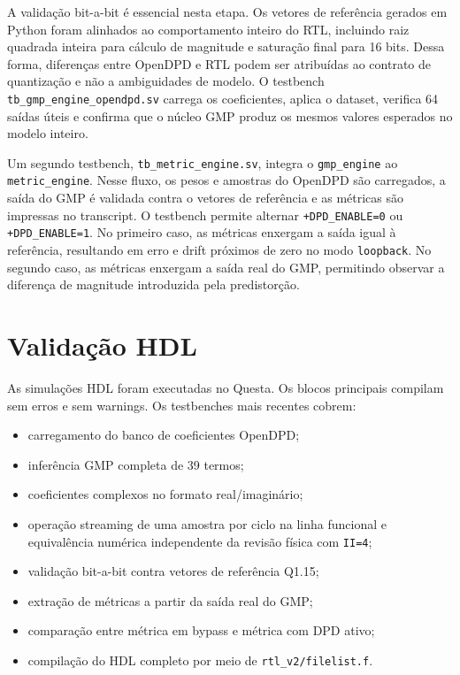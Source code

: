 \documentclass[journal,comsoc]{IEEEtran}
\begin{document}
A validação bit-a-bit é essencial nesta etapa. Os vetores de referência gerados em Python foram alinhados ao comportamento inteiro do RTL, incluindo raiz quadrada inteira para cálculo de magnitude e saturação final para 16 bits. Dessa forma, diferenças entre OpenDPD e RTL podem ser atribuídas ao contrato de quantização e não a ambiguidades de modelo. O testbench \texttt{tb\_gmp\_engine\_opendpd.sv} carrega os coeficientes, aplica o dataset, verifica 64 saídas úteis e confirma que o núcleo GMP produz os mesmos valores esperados no modelo inteiro.

Um segundo testbench, \texttt{tb\_metric\_engine.sv}, integra o \texttt{gmp\_engine} ao \texttt{metric\_engine}. Nesse fluxo, os pesos e amostras do OpenDPD são carregados, a saída do GMP é validada contra o vetores de referência e as métricas são impressas no transcript. O testbench permite alternar \texttt{+DPD\_ENABLE=0} ou \texttt{+DPD\_ENABLE=1}. No primeiro caso, as métricas enxergam a saída igual à referência, resultando em erro e drift próximos de zero no modo \texttt{loopback}. No segundo caso, as métricas enxergam a saída real do GMP, permitindo observar a diferença de magnitude introduzida pela predistorção.

\section{Validação HDL}
As simulações HDL foram executadas no Questa. Os blocos principais compilam sem erros e sem warnings. Os testbenches mais recentes cobrem:

\begin{itemize}
    \item carregamento do banco de coeficientes OpenDPD;
    \item inferência GMP completa de 39 termos;
    \item coeficientes complexos no formato real/imaginário;
    \item operação streaming de uma amostra por ciclo na linha funcional e equivalência numérica independente da revisão física com \texttt{II=4};
    \item validação bit-a-bit contra vetores de referência Q1.15;
    \item extração de métricas a partir da saída real do GMP;
    \item comparação entre métrica em bypass e métrica com DPD ativo;
    \item compilação do HDL completo por meio de \texttt{rtl\_v2/filelist.f}.
\end{itemize}
\end{document}
